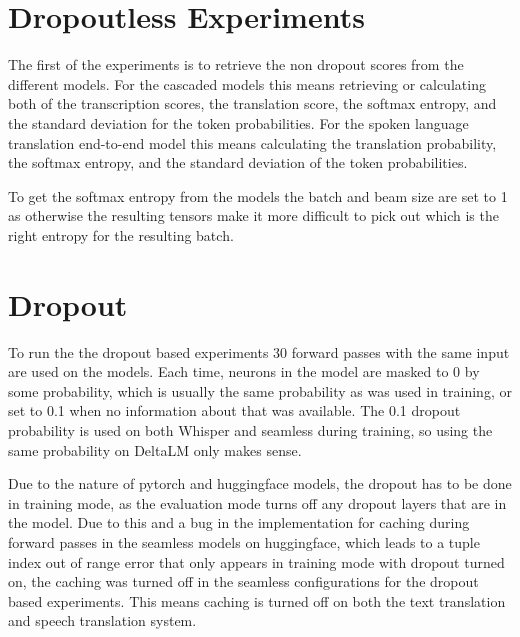\section{Dropoutless Experiments}
The first of the experiments is to retrieve the non dropout scores from the different models. For the cascaded models this means retrieving or calculating both of the transcription scores, the translation score, the softmax entropy, and the standard deviation for the token probabilities. 
For the spoken language translation end-to-end model this means calculating the translation probability, the softmax entropy, and the standard deviation of the token probabilities.


To get the softmax entropy from the models the batch and beam size are set to 1 as otherwise the resulting tensors make it more difficult to pick out which is the right entropy for the resulting batch. 


\section{Dropout}\label{experiment:dropout}
To run the the dropout based experiments 30 forward passes with the same input are used on the models. 
Each time, neurons in the model are masked to 0 by some probability, which is usually the same probability as was used in training, or set to 0.1 when no information about that was available. The 0.1 dropout probability is used on both Whisper and seamless during training, so using the same probability on DeltaLM only makes sense. 

Due to the nature of pytorch and huggingface models, the dropout has to be done in training mode, as the evaluation mode turns off any dropout layers that are in the model. Due to this and a bug in the implementation for caching during forward passes in the seamless models on huggingface, which leads to a tuple index out of range error that only appears in training mode with dropout turned on, the caching was turned off in the seamless configurations for the dropout based experiments. This means caching is turned off on both the text translation and speech translation system.

